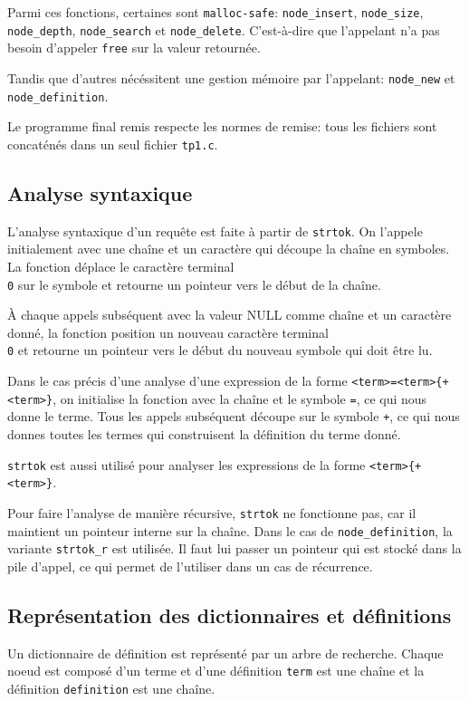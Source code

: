 \documentclass{article}
\begin{document}
Parmi ces fonctions, certaines sont \texttt{malloc-safe}: \texttt{node\_insert},
\texttt{node\_size}, \texttt{node\_depth}, \texttt{node\_search} et
\texttt{node\_delete}. C'est-à-dire que l'appelant n'a pas
besoin d'appeler \texttt{free} sur la valeur retournée.

Tandis que d'autres nécéssitent une gestion mémoire par l'appelant:
\texttt{node\_new} et \texttt{node\_definition}.

Le programme final remis respecte les normes de remise: tous les fichiers sont
concaténés dans un seul fichier \texttt{tp1.c}.

\subsection{Analyse syntaxique}
L'analyse syntaxique d'un requête est faite à partir de \texttt{strtok}. On
l'appele initialement avec une chaîne et un caractère qui découpe la chaîne en
symboles. La fonction déplace le caractère terminal \texttt{\\0} sur le symbole
et retourne un pointeur vers le début de la chaîne.

À chaque appels subséquent avec la valeur NULL comme chaîne et un caractère
donné, la fonction position un nouveau caractère terminal \texttt{\\0} et
retourne un pointeur vers le début du nouveau symbole qui doit être lu.

Dans le cas précis d'une analyse d'une expression de la forme
\texttt{<term>=<term>\{+<term>\}}, on initialise la fonction avec la
chaîne et le symbole \texttt{=}, ce qui nous donne le terme. Tous les appels
subséquent découpe sur le symbole \texttt{+}, ce qui nous donnes toutes les
termes qui construisent la définition du terme donné.

\texttt{strtok} est aussi utilisé pour analyser les expressions de la forme
\texttt{<term>\{+<term>\}}.

Pour faire l'analyse de manière récursive, \texttt{strtok} ne fonctionne pas,
car il maintient un pointeur interne sur la chaîne. Dans le cas de
\texttt{node\_definition}, la variante \texttt{strtok\_r} est utilisée. Il faut
lui passer un pointeur qui est stocké dans la pile d'appel, ce qui permet de
l'utiliser dans un cas de récurrence.

\subsection{Représentation des dictionnaires et définitions}
Un dictionnaire de définition est représenté par un arbre de recherche. Chaque
noeud est composé d'un terme et d'une définition \texttt{term} est une chaîne et
la définition \texttt{definition} est une chaîne.
\end{document}
